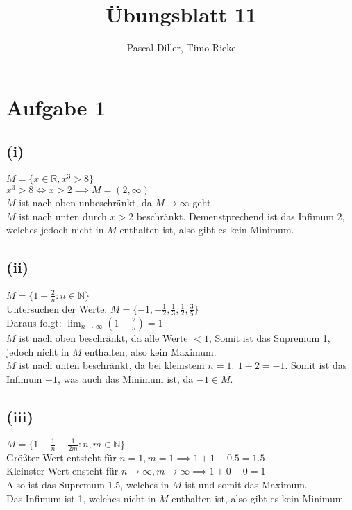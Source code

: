 \documentclass{article}
\title{Übungsblatt 11}
\author{Pascal Diller, Timo Rieke}
\begin{document}
\maketitle
\section*{Aufgabe 1}
\subsection*{(i)}
$M = \{ x \in \mathbb{R}, x^3 > 8\}$ \\
$x^3 > 8 \Leftrightarrow x > 2 \implies M = (2, \infty)$ \\
\newline
$M$ ist nach oben unbeschränkt, da $M \to \infty$ geht. \\
$M$ ist nach unten durch $x > 2$ beschränkt. Demenstprechend ist das Infimum 2, welches jedoch nicht in $M$ enthalten ist, also gibt es kein Minimum. \\
\subsection*{(ii)}
$M = \{1 - \frac{2}{n}: n \in \mathbb{N}\}$ \\
Untersuchen der Werte: $M = \{-1, -\frac{1}{2}, \frac{1}{3}, \frac{1}{2}, \frac{3}{5}\}$ \\
Daraus folgt: $\lim_{n \to \infty} \left(1 - \frac{2}{n}\right) = 1$ \\
\newline
$M$ ist nach oben beschränkt, da alle Werte $< 1$, Somit ist das Supremum 1, jedoch nicht in $M$ enthalten, also kein Maximum. \\
\newline
$M$ ist nach unten beschränkt, da bei kleinstem $n = 1: \: 1- 2 = -1$. Somit ist das Infimum $-1$, was auch das Minimum ist, da $-1 \in M$.
\subsection*{(iii)}
$M = \{1 + \frac{1}{n} - \frac{1}{2m}: n,m \in \mathbb{N}\}$ \\
Größter Wert entsteht für $n = 1, m = 1\implies 1 + 1 - 0.5 = 1.5$ \\
Kleinster Wert ensteht für $n \to \infty, m \to \infty \implies 1 + 0 - 0 = 1$ \\
Also ist das Supremum 1.5, welches in $M$ ist und somit das Maximum. \\
Das Infimum ist 1, welches nicht in $M$ enthalten ist, also gibt es kein Minimum
\end{document}
